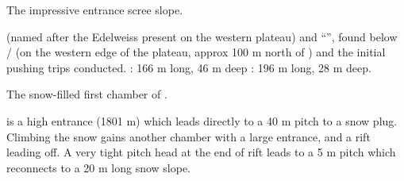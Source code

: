 \begin{pagefigure}
      \checkoddpage \ifoddpage \forcerectofloat \else \forceversofloat \fi
      \centering
  \caption{The impressive  entrance scree slope. }
\end{pagefigure}

 (named after the Edelweiss present on the western plateau) and ``'', found below / (on the western edge
of the plateau, approx 100 m north of ) and the initial pushing trips conducted. : 166 m long, 46 m deep : 196 m long, 28 m deep.

\begin{marginfigure}
\caption{The snow-filled first chamber of . }
\end{marginfigure}

 is a high entrance (1801 m) which leads directly to a 40 m pitch to a snow plug. Climbing the snow gains another chamber with a large entrance, and a rift leading off. A very tight pitch head at the end of rift leads to a 5 m pitch which reconnects to a 20 m long snow slope. 

